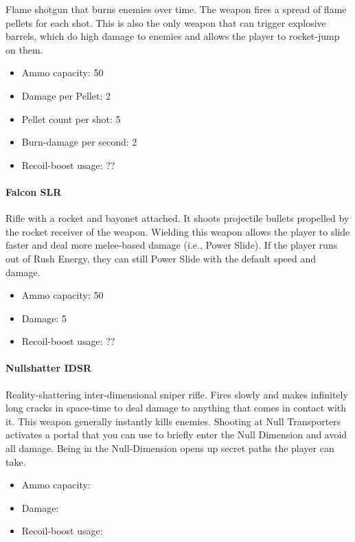 \documentclass[12pt]{article}
\begin{document}
Flame shotgun that burns enemies over time. The weapon fires a spread of flame pellets for each shot. This is also the only weapon that can trigger explosive barrels, which do high damage to enemies and allows the player to rocket-jump on them. 

\begin{itemize}
	\item Ammo capacity: 50
	\item Damage per Pellet: 2
	\item Pellet count per shot: 5
	\item Burn-damage per second: 2
	\item Recoil-boost usage: ??
\end{itemize} 

\paragraph{Falcon SLR}

Rifle with a rocket and bayonet attached. It shoots projectile bullets propelled by the rocket receiver of the weapon. Wielding this weapon allows the player to slide faster and deal more melee-based damage (i.e., Power Slide). If the player runs out of Rush Energy, they can still Power Slide with the default speed and damage. 

\begin{itemize}
	\item Ammo capacity: 50
	\item Damage: 5
	\item Recoil-boost usage: ??
\end{itemize} 


\paragraph{Nullshatter IDSR}

Reality-shattering inter-dimensional sniper rifle. Fires slowly and makes infinitely long cracks in space-time to deal damage to anything that comes in contact with it. This weapon generally instantly kills enemies. Shooting at Null Transporters activates a portal that you can use to briefly enter the Null Dimension and avoid all damage. Being in the Null-Dimension opens up secret paths the player can take.

\begin{itemize}
	\item Ammo capacity: 
	\item Damage: 
	\item Recoil-boost usage:
\end{itemize}
\end{document}
